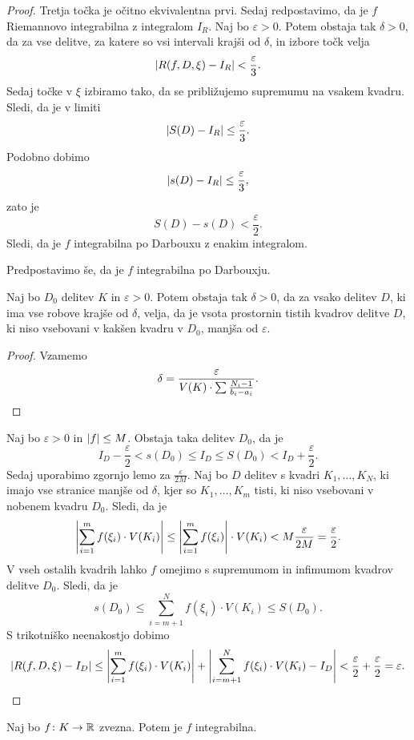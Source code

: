 \begin{proof}
Tretja točka je očitno ekvivalentna prvi. Sedaj redpostavimo, da je
$f$ Riemannovo integrabilna z integralom $I_R$. Naj bo
$\varepsilon > 0$. Potem obstaja tak $\delta > 0$, da za vse
delitve, za katere so vsi intervali krajši od $\delta$, in izbore
točk velja
\[
\left\lvert R(f,D,\xi) - I_R\right\rvert < \frac{\varepsilon}{3}.
\]
Sedaj točke v $\xi$ izbiramo tako, da se približujemo supremumu na
vsakem kvadru. Sledi, da je v limiti
\[
\left\lvert S(D) - I_R\right\rvert \leq \frac{\varepsilon}{3}.
\]
Podobno dobimo
\[
\left\lvert s(D) - I_R\right\rvert \leq \frac{\varepsilon}{3},
\]
zato je
\[
S(D) - s(D) < \frac{\varepsilon}{2}.
\]
Sledi, da je $f$ integrabilna po Darbouxu z enakim integralom.

Predpostavimo še, da je $f$ integrabilna po Darbouxju.

\begin{lema*}
Naj bo $D_0$ delitev $K$ in $\varepsilon > 0$. Potem obstaja tak
$\delta > 0$, da za vsako delitev $D$, ki ima vse robove krajše od
$\delta$, velja, da je vsota prostornin tistih kvadrov delitve $D$,
ki niso vsebovani v kakšen kvadru v $D_0$, manjša od $\varepsilon$.
\end{lema*}

\begin{proof}
Vzamemo
\[
\delta = \frac{\varepsilon}{V(K) \cdot \sum \frac{N_i-1}{b_i-a_i}}.
\qedhere
\]
\end{proof}

Naj bo $\varepsilon > 0$ in $\left\lvert f\right\rvert \leq M$. Obstaja taka delitev
$D_0$, da je
\[
I_D - \frac{\varepsilon}{2} < s(D_0) \leq
I_D \leq S(D_0) < I_D + \frac{\varepsilon}{2}.
\]
Sedaj uporabimo zgornjo lemo za $\frac{\varepsilon}{2M}$. Naj bo
$D$ delitev s kvadri $K_1,\dots,K_N$, ki imajo vse stranice manjše
od $\delta$, kjer so $K_1,\dots,K_m$ tisti, ki niso vsebovani v
nobenem kvadru $D_0$. Sledi, da je
\[
\left\lvert \sum_{i=1}^m f(\xi_i) \cdot V(K_i)\right\rvert \leq
\left\lvert \sum_{i=1}^m f(\xi_i)\right\rvert \cdot V(K_i) <
M \frac{\varepsilon}{2M} = \frac{\varepsilon}{2}.
\]
V vseh ostalih kvadrih lahko $f$ omejimo s supremumom in infimumom
kvadrov delitve $D_0$. Sledi, da je
\[
s(D_0) \leq \sum_{i=m+1}^N f(\xi_i) \cdot V(K_i) \leq S(D_0).
\]
S trikotniško neenakostjo dobimo
\[
\left\lvert R(f,D,\xi) - I_D\right\rvert \leq
\left\lvert \sum_{i=1}^m f(\xi_i) \cdot V(K_i)\right\rvert +
\left\lvert \sum_{i=m+1}^N f(\xi_i) \cdot V(K_i) - I_D\right\rvert <
\frac{\varepsilon}{2} + \frac{\varepsilon}{2} = \varepsilon.
\qedhere
\]
\end{proof}

\begin{izrek}
Naj bo $f \colon K \to \mathbb{R}$ zvezna. Potem je $f$ integrabilna.
\end{izrek}

